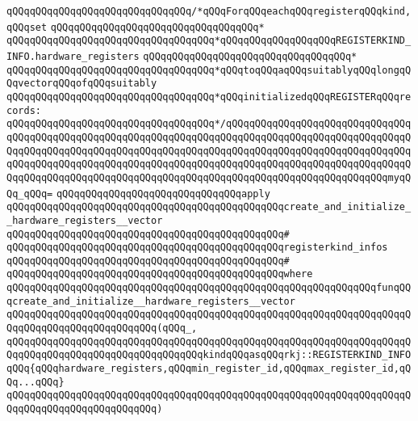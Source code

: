 \verb|qQQqqQQqqQQqqQQqqQQqqQQqqQQqqQQq/*qQQqForqQQqeachqQQqregisterqQQqkind,qQQqset|\newline
\verb|qQQqqQQqqQQqqQQqqQQqqQQqqQQqqQQqqQQq*|\newline
\verb|qQQqqQQqqQQqqQQqqQQqqQQqqQQqqQQqqQQq*qQQqqQQqqQQqqQQqqQQqREGISTERKIND_INFO.hardware_registers|\newline
\verb|qQQqqQQqqQQqqQQqqQQqqQQqqQQqqQQqqQQq*|\newline
\verb|qQQqqQQqqQQqqQQqqQQqqQQqqQQqqQQqqQQq*qQQqtoqQQqaqQQqsuitablyqQQqlongqQQqvectorqQQqofqQQqsuitably|\newline
\verb|qQQqqQQqqQQqqQQqqQQqqQQqqQQqqQQqqQQq*qQQqinitializedqQQqREGISTERqQQqrecords:|\newline
\verb|qQQqqQQqqQQqqQQqqQQqqQQqqQQqqQQqqQQq*/qQQqqQQqqQQqqQQqqQQqqQQqqQQqqQQqqQQqqQQqqQQqqQQqqQQqqQQqqQQqqQQqqQQqqQQqqQQqqQQqqQQqqQQqqQQqqQQqqQQqqQQqqQQqqQQqqQQqqQQqqQQqqQQqqQQqqQQqqQQqqQQqqQQqqQQqqQQqqQQqqQQqqQQqqQQqqQQqqQQqqQQqqQQqqQQqqQQqqQQqqQQqqQQqqQQqqQQqqQQqqQQqqQQqqQQqqQQqqQQqqQQqqQQqqQQqqQQqqQQqqQQqqQQqqQQqqQQqqQQqqQQqqQQqqQQqqQQqqQQqqQQqqQQqmyqQQq_qQQq=|\newline
\verb|qQQqqQQqqQQqqQQqqQQqqQQqqQQqqQQqapply|\newline
\verb|qQQqqQQqqQQqqQQqqQQqqQQqqQQqqQQqqQQqqQQqqQQqqQQqcreate_and_initialize__hardware_registers__vector|\newline
\verb|qQQqqQQqqQQqqQQqqQQqqQQqqQQqqQQqqQQqqQQqqQQqqQQq#|\newline
\verb|qQQqqQQqqQQqqQQqqQQqqQQqqQQqqQQqqQQqqQQqqQQqqQQqregisterkind_infos|\newline
\verb|qQQqqQQqqQQqqQQqqQQqqQQqqQQqqQQqqQQqqQQqqQQqqQQq#|\newline
\verb|qQQqqQQqqQQqqQQqqQQqqQQqqQQqqQQqqQQqqQQqqQQqqQQqwhere|\newline
\verb|qQQqqQQqqQQqqQQqqQQqqQQqqQQqqQQqqQQqqQQqqQQqqQQqqQQqqQQqqQQqqQQqfunqQQqcreate_and_initialize__hardware_registers__vector|\newline
\verb|qQQqqQQqqQQqqQQqqQQqqQQqqQQqqQQqqQQqqQQqqQQqqQQqqQQqqQQqqQQqqQQqqQQqqQQqqQQqqQQqqQQqqQQqqQQqqQQq(qQQq_,|\newline
\verb|qQQqqQQqqQQqqQQqqQQqqQQqqQQqqQQqqQQqqQQqqQQqqQQqqQQqqQQqqQQqqQQqqQQqqQQqqQQqqQQqqQQqqQQqqQQqqQQqqQQqqQQqkindqQQqasqQQqrkj::REGISTERKIND_INFOqQQq{qQQqhardware_registers,qQQqmin_register_id,qQQqmax_register_id,qQQq...qQQq}|\newline
\verb|qQQqqQQqqQQqqQQqqQQqqQQqqQQqqQQqqQQqqQQqqQQqqQQqqQQqqQQqqQQqqQQqqQQqqQQqqQQqqQQqqQQqqQQqqQQqqQQq)|\newline
